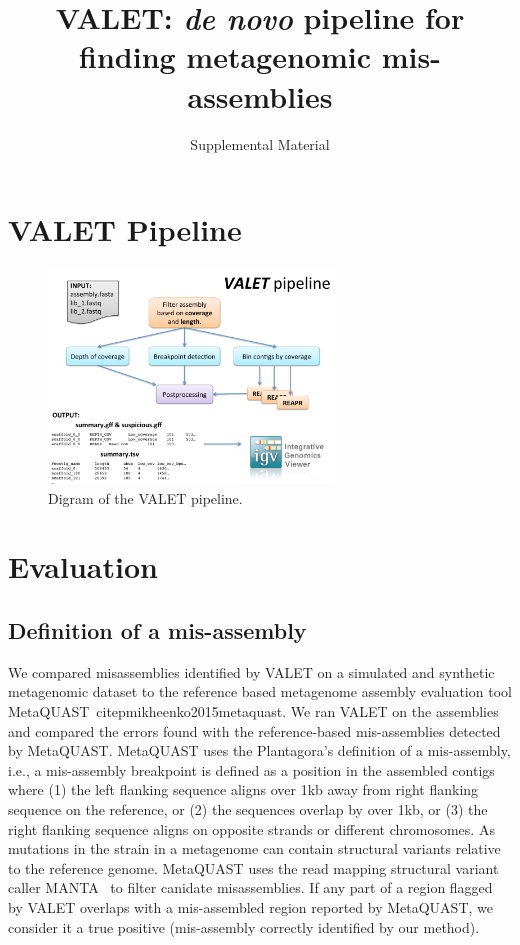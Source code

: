 \documentclass{article}
\begin{document}
\title{VALET: \emph{de novo} pipeline for finding metagenomic mis-assemblies}
\author{Supplemental Material}
\date{}
\maketitle
\section{VALET Pipeline}

\begin{figure}[tb!]
\begin{center}
\includegraphics[width=3in]{figures/valet_pipeline}
\end{center}
\caption[valet_pipeline]{Digram of the VALET pipeline.}
\label{fig:valet_pipeline}
\end{figure}

\section{Evaluation}
\subsection{Definition of a mis-assembly}
We compared misassemblies identified by VALET on a simulated and synthetic metagenomic dataset to the reference based metagenome assembly evaluation tool MetaQUAST~citep{mikheenko2015metaquast}.
We ran VALET on the assemblies and compared the errors found with the reference-based mis-assemblies detected by MetaQUAST.
MetaQUAST uses the Plantagora’s definition of a mis-assembly,
i.e., a mis-assembly breakpoint is defined as a position in the assembled contigs where (1) the left flanking
sequence aligns over 1kb away from right flanking sequence on the reference, or (2) the sequences overlap by
over 1kb, or (3) the right flanking sequence aligns on opposite strands or different chromosomes. 
As mutations in the strain in a metagenome can contain structural variants relative to the reference genome. 
MetaQUAST uses the read mapping structural variant caller MANTA~\citep{chen2015manta} to filter canidate misassemblies. 
If any part of a region flagged by VALET overlaps with a mis-assembled region reported by MetaQUAST, we consider it a true positive (mis-assembly correctly identified by our method).
\end{document}
